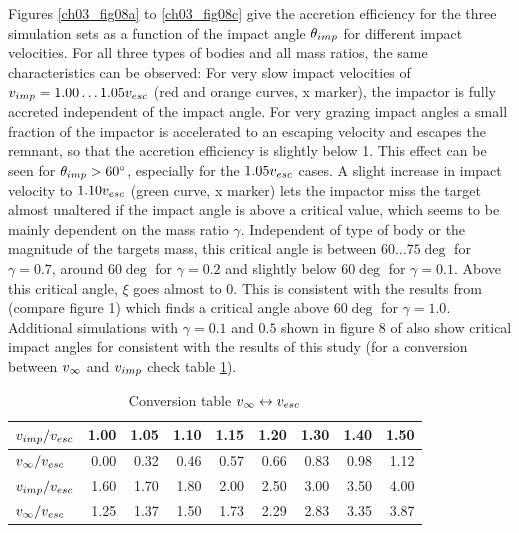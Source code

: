 Figures \ref{ch03_fig08a} to \ref{ch03_fig08c} give the accretion efficiency for the three simulation sets as a function of the impact angle $\theta_{imp}$ for different impact velocities. For all three types of bodies and all mass ratios, the same characteristics can be observed: For very slow impact velocities of $v_{imp} = 1.00 \dots 1.05 v_{esc}$ (red and orange curves, x marker), the impactor is fully accreted independent of the impact angle. For very grazing impact angles a small fraction of the impactor is accelerated to an escaping velocity and escapes the remnant, so that the accretion efficiency is slightly below 1. This effect can be seen for $\theta_{imp} > 60 ^\circ$, especially for the $1.05 v_{esc}$ cases. A slight increase in impact velocity to $1.10 v_{esc}$ (green curve, x marker) lets the impactor miss the target almost unaltered if the impact angle is above a critical value, which seems to be mainly dependent on the mass ratio $\gamma$. Independent of type of body or the magnitude of the targets mass, this critical angle is between $60 \dots 75 \deg$ for $\gamma = 0.7$,  around $60 \deg$ for $\gamma = 0.2$ and slightly below $60 \deg$ for $\gamma = 0.1$. Above this critical angle, $\xi$ goes almost to 0. This is consistent with the results from \cite{Agnor:2004p3329} (compare figure 1) which finds a critical angle above $60 \deg$ for $\gamma = 1.0$. Additional simulations with $\gamma = 0.1$ and $0.5$ shown in figure 8 of \cite{Asphaug:2010p3539} also show critical impact angles for consistent with the results of this study (for a conversion between $v_{\infty}$ and $v_{imp}$ check table \ref{ch03_tbl01}).
\begin{table}[htdp]
\begin{center}
\begin{tabular}{l|r|r|r|r|r|r|r|r}
$v_{imp} / v_{esc}$ & 1.00 & 1.05 & 1.10 & 1.15 & 1.20 & 1.30 & 1.40 & 1.50 \\
\hline
$v_{\infty} / v_{esc}$ & 0.00 & 0.32 & 0.46 & 0.57 & 0.66 & 0.83 & 0.98 & 1.12\\
\hline
\hline
$v_{imp} / v_{esc}$ & 1.60 & 1.70 & 1.80 & 2.00 & 2.50 & 3.00 & 3.50 & 4.00\\
\hline
$v_{\infty} / v_{esc}$ & 1.25 & 1.37 & 1.50 & 1.73 & 2.29 & 2.83 & 3.35 & 3.87\\
\end{tabular}
\end{center}
\caption{Conversion table $v_{\infty} \leftrightarrow v_{esc}$}
\label{ch03_tbl01}
\end{table} 
